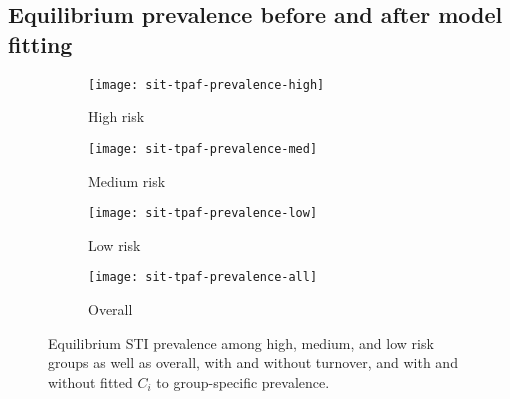 \subsection{Equilibrium prevalence before and after model fitting}
\begin{figure}[H]
  \centering
  \begin{subfigure}{0.45\linewidth}
    \centering\texttt{[image: sit-tpaf-prevalence-high]}
    \caption{High risk}
    \label{fig:tpaf-prevalence-high}
  \end{subfigure}
  \begin{subfigure}{0.45\linewidth}
    \centering\texttt{[image: sit-tpaf-prevalence-med]}
    \caption{Medium risk}
    \label{fig:tpaf-prevalence-med}
  \end{subfigure}
  \begin{subfigure}{0.45\linewidth}
    \centering\texttt{[image: sit-tpaf-prevalence-low]}
    \caption{Low risk}
    \label{fig:tpaf-prevalence-low}
  \end{subfigure}
  \begin{subfigure}{0.45\linewidth}
    \centering\texttt{[image: sit-tpaf-prevalence-all]}
    \caption{Overall}
    \label{fig:tpaf-prevalence-all}
  \end{subfigure}
  \caption{Equilibrium STI prevalence among high, medium, and low risk groups as well as overall,
    with and without turnover,
    and with and without fitted $C_i$ to group-specific prevalence.}
  \label{fig:tpaf-prevalence}
\end{figure}
